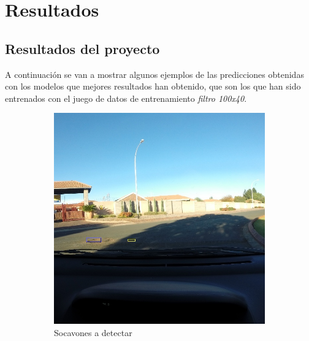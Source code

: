 \section{Resultados}

\subsection{Resultados del proyecto}

A continuación se van a mostrar algunos ejemplos de las predicciones obtenidas con los modelos que mejores resultados han obtenido, que son los que han sido entrenados con el juego de datos de entrenamiento \textit{filtro 100x40}.

\begin{figure}[H]
	\centering
	\begin{subfigure}[h]{0.45\linewidth}
		\includegraphics[width=\linewidth]{images/results_a_gt.jpg}
		\caption{Socavones a detectar}
	\end{subfigure}
	\begin{subfigure}[h]{0.45\linewidth}

\end{subfigure}
\end{figure}
